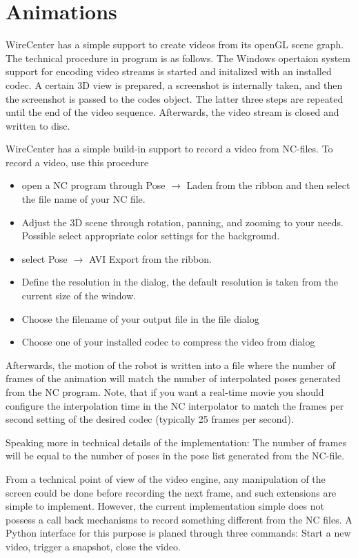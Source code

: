\documentclass[11pt,a4paper,onepage,openany]{book}
\begin{document}
\section{Animations}
WireCenter has a simple support to create videos from its openGL scene graph.
The technical procedure in program is as follows. The Windows opertaion
system support for encoding video streams is started and initalized with an
installed codec. A certain 3D view is prepared, a screenshot is internally
taken, and then the screenshot is passed to the codes object. The latter
three steps are repeated until the end of the video sequence. Afterwards, the
video stream is closed and written to disc.

WireCenter has a simple build-in support to record a video from NC-files. To
record a video, use this procedure
\begin{itemize}
  \item open a NC program through Pose $\rightarrow$ Laden from the ribbon
      and then select the file name of your NC file.
  \item Adjust the 3D scene through rotation, panning, and zooming to your
      needs. Possible select appropriate color settings for the background.
  \item select Pose $\rightarrow$ AVI Export from the ribbon.
  \item Define the resolution in the dialog, the default resolution is taken
      from the current size of the window.
  \item Choose the filename of your output file in the file dialog
  \item Choose one of your installed codec to compress the video from dialog
\end{itemize}
Afterwards, the motion of the robot is written into a file where the number of
frames of the animation will match the number of interpolated poses generated
from the NC program. Note, that if you want a real-time movie you should
configure the interpolation time in the NC interpolator to match the frames per
second setting of the desired codec (typically 25 frames per second).

Speaking more in technical details of the implementation: The number of
frames will be equal to the number of poses in the pose list generated from
the NC-file.

From a technical point of view of the video engine, any manipulation of the
screen could be done before recording the next frame, and such extensions are
simple to implement. However, the current implementation simple does not
possess a call back mechanisms to record something different from the NC
files. A Python interface for this purpose is planed through three commands:
Start a new video, trigger a snapshot, close the video.
\end{document}
